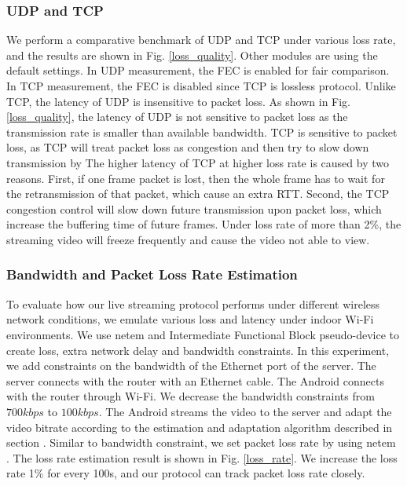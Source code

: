 \subsubsection{UDP and TCP}


We perform a comparative benchmark of UDP and TCP under various 
loss rate, and the results are shown in Fig. \ref{loss_quality}. 
Other modules are using the default settings. 
In UDP measurement, the FEC is enabled for fair
comparison. 
In TCP measurement, the FEC is disabled since
TCP is lossless protocol. 
Unlike TCP, the latency of UDP is insensitive to packet loss. 
As shown in Fig. \ref{loss_quality}, the latency of UDP is not sensitive
to packet loss as the transmission rate is smaller
than available bandwidth. 
TCP is sensitive to packet loss, as TCP will treat packet loss
as congestion and then try to slow down transmission by 
The higher latency of TCP at higher loss rate is caused by 
two reasons. 
First, if one frame packet is lost, then the whole frame has to
wait for the retransmission of that packet, 
which cause an extra RTT. 
Second, the TCP congestion control will slow down future transmission
upon packet loss, which increase the buffering time of 
future frames. 
Under loss rate of more than 2\%, the streaming video will freeze
frequently and cause the video not able to view. 



\subsubsection{Bandwidth and Packet Loss Rate Estimation}

To evaluate how our live streaming protocol performs under 
different wireless network conditions, 
we emulate various loss and latency under indoor Wi-Fi
environments.  
We use netem and Intermediate Functional Block pseudo-device \cite{netem} to 
create loss, extra network delay and bandwidth constraints. 
In this experiment, we add constraints on the bandwidth of the 
Ethernet port of the server. 
The server connects with the router with an Ethernet cable. 
The Android connects with the router through Wi-Fi. 
We decrease the bandwidth constraints from $700kbps$ to $100kbps$. 
The Android streams the video to the server and adapt 
the video bitrate according to the estimation and adaptation algorithm
described in section \label{sec_bandwidth}. 
Similar to bandwidth constraint, we set packet loss rate by using 
netem \cite{netem}. 
The loss rate estimation result is shown in Fig. \ref{loss_rate}. 
We increase the loss rate 1\% for every 100s, 
and our protocol can track packet loss rate closely. 



